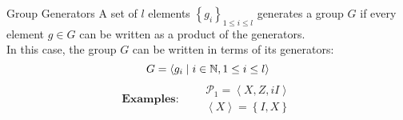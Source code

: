 \begin{frame}{Group Generators}
    A set of \(l\) elements \(\left\{g_i\right\}_{1\leq i\leq l}\)
    generates a group \(G\) if every element \(g\in G\) can be written as a product of the generators. \\
    In this case, the group \(G\) can be written in terms of its generators:
    \[
        G=\left\langle g_i\mid i\in\operatorname{\mathbb{N}},1\leq i\leq l\right\rangle
    \]
    \[
        \textbf{Examples:}\qquad
        \begin{matrix}
            \mathcal{P}_1=\left\langle X,Z,iI\right\rangle \\
            \left\langle X\right\rangle = \left\{I,X\right\}
        \end{matrix}
    \]

    \vspace*{25mm}

\end{frame}